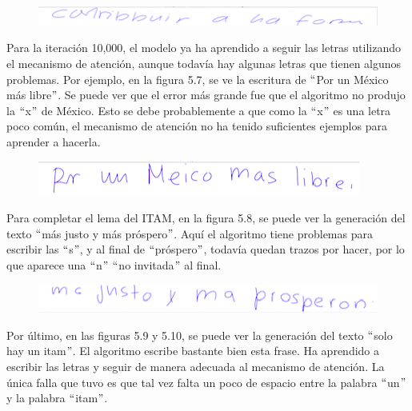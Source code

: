 \begin{figure}[h]
\begin{center}
\includegraphics{./imag/contribuir8700.png}
\end{center}
\caption{}
\end{figure}

Para la iteración 10,000, el modelo ya ha aprendido a seguir las letras utilizando el mecanismo de atención, aunque todavía hay algunas letras que tienen algunos problemas. Por ejemplo, en la figura 5.7, se ve la escritura de $``$Por un México más libre$"$. Se puede ver que el error más grande fue que el algoritmo no produjo la $``$x$"$ de México. Esto se debe probablemente a que como la $``$x$"$ es una letra poco común, el mecanismo de atención no ha tenido suficientes ejemplos para aprender a hacerla.

\begin{figure}[htbp]
\begin{center}
\includegraphics{./imag/por_un_10000.png}
\end{center}
\caption{}
\end{figure}

Para completar el lema del ITAM, en la figura 5.8, se puede ver la generación del texto $``$más justo y más próspero$"$. Aquí el algoritmo tiene problemas para escribir las $``$s$"$, y al final de $``$próspero$"$, todavía quedan trazos por hacer, por lo que aparece una $``$n$"$ $``$no invitada$"$ al final.

\begin{figure}[b]
\begin{center}
\includegraphics{./imag/justo10000.png}
\end{center}
\caption{}
\end{figure}

\vspace{3em}

Por último, en las figuras 5.9 y 5.10, se puede ver la generación del texto $``$solo hay un itam$"$. El algoritmo escribe bastante bien esta frase. Ha aprendido a escribir las letras y seguir de manera adecuada al mecanismo de atención.  La única falla que tuvo es que tal vez falta un poco de espacio entre la palabra $``$un$"$ y la palabra $``$itam$"$.

